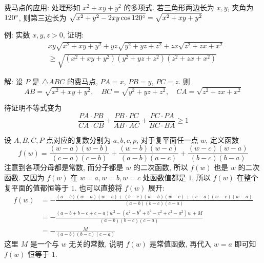\newpage

费马点的应用: 处理形如 $x^2+xy+y^2$ 的多项式. 若三角形两边长为 $x,y$, 夹角为 $120\degree$, 则第三边长为 $\sqrt{x^2+y^2-2xy\cos 120\degree} = \sqrt{x^2+xy+y^2}$

例: 实数 $x,y,z > 0$, 证明:
\begin{align*}
& xy\sqrt{x^2+xy+y^2} + yz\sqrt{y^2+yz+z^2} + zx\sqrt{z^2+zx+x^2} \\
 & \ge \sqrt{(x^2+xy+y^2)(y^2+yz+z^2)(z^2+zx+x^2)}
\end{align*}

解: 设 $P$ 是 $\triangle ABC$ 的费马点, $PA=x$, $PB=y$, $PC=z$. 则
\[ 
AB = \sqrt{x^2+xy+y^2}, \quad
BC = \sqrt{y^2+yz+z^2}, \quad
CA = \sqrt{z^2+zx+x^2}
\]
\begin{figure*}[htbp]
\centering
{}
\end{figure*}

待证明不等式变为
\[\frac{PA\cdot PB}{CA\cdot CB} + \frac{PB\cdot PC}{AB\cdot AC} + \frac{PC\cdot PA}{BC\cdot BA} \ge 1\]

设 $A,B,C,P$ 点对应的复数分别为 $a,b,c,p$, 对于复平面任一点 $w$, 定义函数
\[f(w) = \frac{(w-a)(w-b)}{(c-a)(c-b)} + \frac{(w-b)(w-c)}{(a-b)(a-c)} + \frac{(w-c)(w-a)}{(b-c)(b-a)}\]
注意到各项分母都是常数, 而分子都是 $w$ 的二次函数, 所以 $f(w)$ 也是 $w$ 的二次函数. 又因为 $f(w)$ 在 $w=a, w=b, w=c$ 处函数值都是 $1$, 所以 $f(w)$ 在整个复平面的值都恒等于 $1$. 也可以直接将 $f(w)$ 展开:
\begin{align*}
f(w) &= -\frac{(a-b)(w-a)(w-b)+(b-c)(w-b)(w-c)+(c-a)(w-c)(w-a)}{(a-b)(b-c)(c-a)} \\
&= -\frac{(a-b+b-c+c-a)w^2-(a^2-b^2+b^2-c^2+c^2-a^2)w+M}{(a-b)(b-c)(c-a)} \\
&= -\frac{M}{(a-b)(b-c)(c-a)}
\end{align*}
这里 $M$ 是一个与 $w$ 无关的常数, 说明 $f(w)$ 是常值函数, 再代入 $w=a$ 即可知 $f(w)$ 恒等于 $1$.

